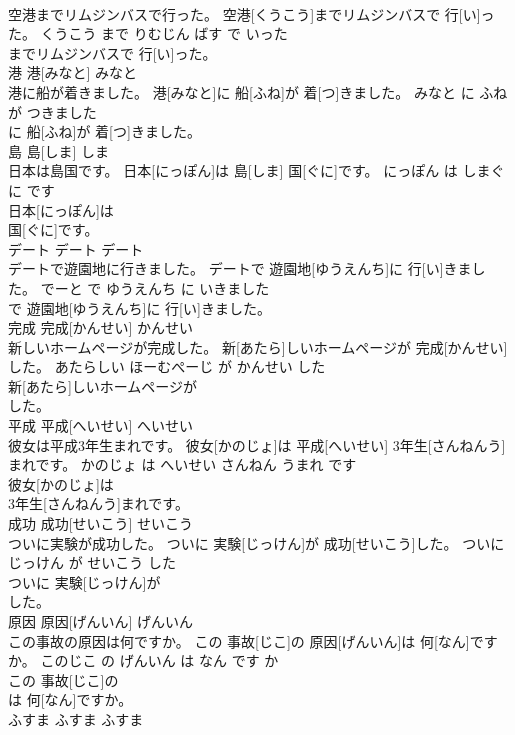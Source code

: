 \documentclass[8pt]{extreport}
\begin{document}
\begin{CJK}{UTF8}{min}
\\	空港までリムジンバスで行った。	空港[くうこう]までリムジンバスで 行[い]った。	くうこう まで りむじん ばす で いった	
\\	までリムジンバスで 行[い]った。		
\\	港	港[みなと]	みなと	
\\	港に船が着きました。	港[みなと]に 船[ふね]が 着[つ]きました。	みなと に ふね が つきました	
\\	に 船[ふね]が 着[つ]きました。		
\\	島	島[しま]	しま	
\\	日本は島国です。	日本[にっぽん]は 島[しま] 国[ぐに]です。	にっぽん は しまぐに です	
\\	日本[にっぽん]は
\\	国[ぐに]です。		
\\	デート	デート	デート	
\\	デートで遊園地に行きました。	デートで 遊園地[ゆうえんち]に 行[い]きました。	でーと で ゆうえんち に いきました	
\\	で 遊園地[ゆうえんち]に 行[い]きました。		
\\	完成	完成[かんせい]	かんせい	
\\	新しいホームページが完成した。	新[あたら]しいホームページが 完成[かんせい]した。	あたらしい ほーむぺーじ が かんせい した	
\\	新[あたら]しいホームページが
\\	した。		
\\	平成	平成[へいせい]	へいせい	
\\	彼女は平成3年生まれです。	彼女[かのじょ]は 平成[へいせい] 3年生[さんねんう]まれです。	かのじょ は へいせい さんねん うまれ です	
\\	彼女[かのじょ]は
\\	3年生[さんねんう]まれです。		
\\	成功	成功[せいこう]	せいこう	
\\	ついに実験が成功した。	ついに 実験[じっけん]が 成功[せいこう]した。	ついに じっけん が せいこう した	
\\	ついに 実験[じっけん]が
\\	した。		
\\	原因	原因[げんいん]	げんいん	
\\	この事故の原因は何ですか。	この 事故[じこ]の 原因[げんいん]は 何[なん]ですか。	このじこ の げんいん は なん です か	
\\	この 事故[じこ]の
\\	は 何[なん]ですか。		
\\	ふすま	ふすま	ふすま	

\end{CJK}
\end{document}
